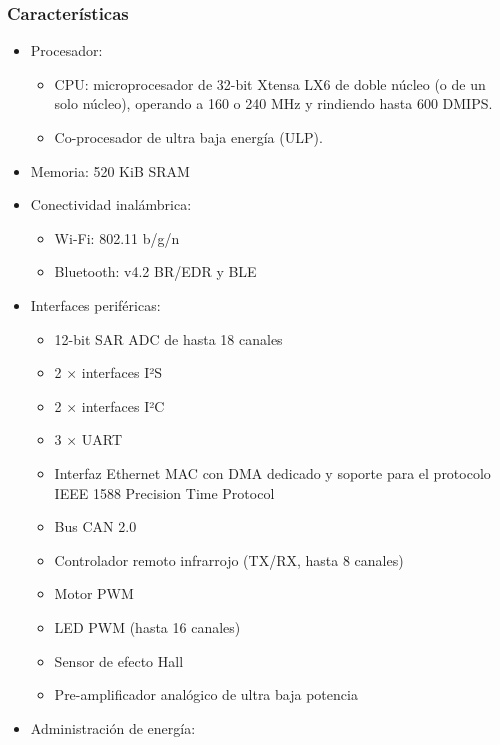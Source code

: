     \subsubsection{Características}
        \begin{itemize}
            \item Procesador:
                \begin{itemize}
                    \item CPU: microprocesador de 32-bit Xtensa LX6 de doble núcleo (o de un solo núcleo), operando a 160 o 240 MHz y rindiendo hasta 600 DMIPS.
                    \item Co-procesador de ultra baja energía (ULP).
                \end{itemize}
            \item Memoria: 520 KiB SRAM
            \item Conectividad inalámbrica:
                \begin{itemize}
                    \item Wi-Fi: 802.11 b/g/n
                    \item Bluetooth: v4.2 BR/EDR y BLE
                \end{itemize}
            \item Interfaces periféricas:
                \begin{itemize}
                    \item 12-bit SAR ADC de hasta 18 canales
                    \item 2 × interfaces I²S
                    \item 2 × interfaces I²C
                    \item 3 × UART
                    \item Interfaz Ethernet MAC con DMA dedicado y soporte para el protocolo IEEE 1588 Precision Time Protocol
                    \item Bus CAN 2.0
                    \item Controlador remoto infrarrojo (TX/RX, hasta 8 canales)
                    \item Motor PWM
                    \item LED PWM (hasta 16 canales)
                    \item Sensor de efecto Hall
                    \item Pre-amplificador analógico de ultra baja potencia
                \end{itemize}
            \item Administración de energía:

\end{itemize}
